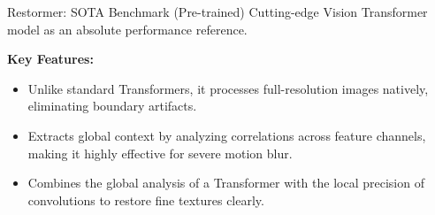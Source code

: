 \documentclass[10pt, handout]{beamer}
\begin{document}
\begin{frame}{Restormer: SOTA Benchmark (Pre-trained)}
    \textbf{} Cutting-edge Vision Transformer model as an absolute performance reference.

    \vspace{0.3cm}
    \textbf{Key Features:}
    \begin{itemize}
        \item \textbf{} Unlike standard Transformers, it processes full-resolution images natively, eliminating boundary artifacts.
        \item \textbf{} Extracts global context by analyzing correlations across feature channels, making it highly effective for severe motion blur.
        \item \textbf{} Combines the global analysis of a Transformer with the local precision of convolutions to restore fine textures clearly.
    \end{itemize}

\end{frame}
\end{document}
